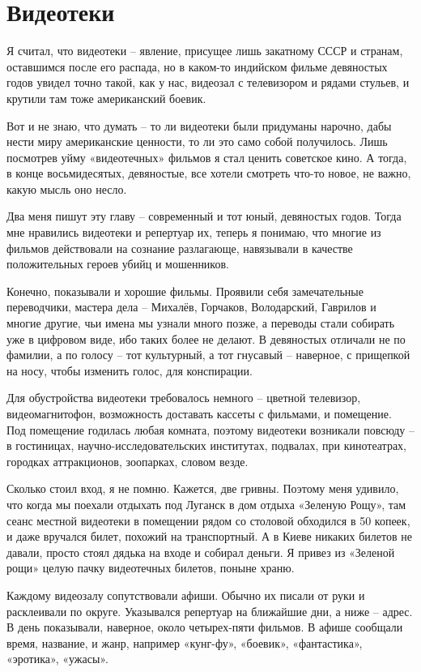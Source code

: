 \chapter{Видеотеки}

Я считал, что видеотеки – явление, присущее лишь закатному СССР и странам, оставшимся после его распада, но в каком-то индийском фильме девяностых годов увидел точно такой, как у нас, видеозал с телевизором и рядами стульев, и крутили там тоже американский боевик.

Вот и не знаю, что думать – то ли видеотеки были придуманы нарочно, дабы нести миру американские ценности, то ли это само собой получилось. Лишь посмотрев уйму «видеотечных» фильмов я стал ценить советское кино. А тогда, в конце восьмидесятых, девяностые, все хотели смотреть что-то новое, не важно, какую мысль оно несло.

Два меня пишут эту главу – современный и тот юный, девяностых годов. Тогда мне нравились видеотеки и репертуар их, теперь я понимаю, что многие из фильмов действовали на сознание разлагающе, навязывали в качестве положительных героев убийц и мошенников.

Конечно, показывали и хорошие фильмы. Проявили себя замечательные переводчики, мастера дела – Михалёв, Горчаков, Володарский, Гаврилов и многие другие, чьи имена мы узнали много позже, а переводы стали собирать уже в цифровом виде, ибо таких более не делают. В девяностых отличали не по фамилии, а по голосу – тот культурный, а тот гнусавый – наверное, с прищепкой на носу, чтобы изменить голос, для конспирации.

Для обустройства видеотеки требовалось немного – цветной телевизор, видеомагнитофон, возможность доставать кассеты с фильмами, и помещение. Под помещение годилась любая комната, поэтому видеотеки возникали повсюду – в гостиницах, научно-исследовательских институтах, подвалах, при кинотеатрах, городках аттракционов, зоопарках, словом везде.

Сколько стоил вход, я не помню. Кажется, две гривны. Поэтому меня удивило, что когда мы поехали отдыхать под Луганск в дом отдыха «Зеленую Рощу», там сеанс местной видеотеки в помещении рядом со столовой обходился в 50 копеек, и даже вручался билет, похожий на транспортный. А в Киеве никаких билетов не давали, просто стоял дядька на входе и собирал деньги. Я привез из «Зеленой рощи» целую пачку видеотечных билетов, поныне храню.

Каждому видеозалу сопутствовали афиши. Обычно их писали от руки и расклеивали по округе. Указывался  репертуар на ближайшие дни, а ниже – адрес. В день показывали, наверное, около четырех-пяти фильмов. В афише сообщали время, название, и жанр, например «кунг-фу», «боевик», «фантастика», «эротика», «ужасы». 

